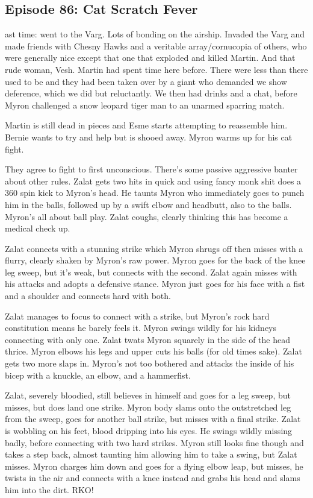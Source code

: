 \subsection{Episode 86: Cat Scratch Fever}

ast time: went to the Varg. Lots of bonding on the airship. Invaded the Varg and made friends with Chesny Hawks and a veritable array/cornucopia of others, who were generally nice except that one that exploded and killed Martin. And that rude woman, Vesh. Martin had spent time here before. There were less than there used to be and they had been taken over by a giant who demanded we show deference, which we did but reluctantly. We then had drinks and a chat, before Myron challenged a snow leopard tiger man to an unarmed sparring match.\medskip

Martin is still dead in pieces and Esme starts attempting to reassemble him. Bernie wants to try and help but is shooed away. Myron warms up for his cat fight.\medskip

They agree to fight to first unconscious. There’s some passive aggressive banter about other rules. Zalat gets two hits in quick and using fancy monk shit does a 360 spin kick to Myron’s head. He taunts Myron who immediately goes to punch him in the balls, followed up by a swift elbow and headbutt, also to the balls. Myron’s all about ball play. Zalat coughs, clearly thinking this has become a medical check up.\medskip

Zalat connects with a stunning strike which Myron shrugs off then misses with a flurry, clearly shaken by Myron’s raw power. Myron goes for the back of the knee leg sweep, but it’s weak, but connects with the second. Zalat again misses with his attacks and adopts a defensive stance. Myron just goes for his face with a fist and a shoulder and connects hard with both.\medskip

Zalat manages to focus to connect with a strike, but Myron’s rock hard constitution means he barely feels it. Myron swings wildly for his kidneys connecting with only one. Zalat twats Myron squarely in the side of the head thrice. Myron elbows his legs and upper cuts his balls (for old times sake). Zalat gets two more slaps in. Myron’s not too bothered and attacks the inside of his bicep with a knuckle, an elbow, and a hammerfist.\medskip

Zalat, severely bloodied, still believes in himself and goes for a leg sweep, but misses, but does land one strike. Myron body slams onto the outstretched leg from the sweep, goes for another ball strike, but misses with a final strike. Zalat is wobbling on his feet, blood dripping into his eyes. He swings wildly missing badly, before connecting with two hard strikes. Myron still looks fine though and takes a step back, almost taunting him allowing him to take a swing, but Zalat misses. Myron charges him down and goes for a flying elbow leap, but misses, he twists in the air and connects with a knee instead and grabs his head and slams him into the dirt. RKO!\medskip

